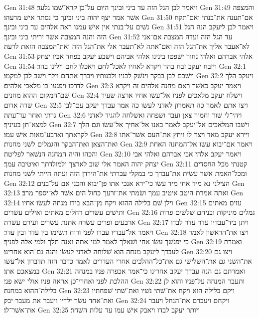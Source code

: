 Gen 31:48  ויאמר לבן הגל הזה עד ביני ובינך היום על־כן קרא־שׁמו גלעד׃
Gen 31:49  והמצפה אשׁר אמר יצף יהוה ביני ובינך כי נסתר אישׁ מרעהו׃
Gen 31:50  אם־תענה את־בנתי ואם־תקח נשׁים על־בנתי אין אישׁ עמנו ראה אלהים עד ביני ובינך׃
Gen 31:51  ויאמר לבן ליעקב הנה הגל הזה והנה המצבה אשׁר יריתי ביני ובינך׃
Gen 31:52  עד הגל הזה ועדה המצבה אם־אני לא־אעבר אליך את־הגל הזה ואם־אתה לא־תעבר אלי את־הגל הזה ואת־המצבה הזאת לרעה׃
Gen 31:53  אלהי אברהם ואלהי נחור ישׁפטו בינינו אלהי אביהם וישׁבע יעקב בפחד אביו יצחק׃
Gen 31:54  ויזבח יעקב זבח בהר ויקרא לאחיו לאכל־לחם ויאכלו לחם וילינו בהר׃
Gen 32:1  וישׁכם לבן בבקר וינשׁק לבניו ולבנותיו ויברך אתהם וילך וישׁב לבן למקמו׃
Gen 32:2  ויעקב הלך לדרכו ויפגעו־בו מלאכי אלהים׃
Gen 32:3  ויאמר יעקב כאשׁר ראם מחנה אלהים זה ויקרא שׁם־המקום ההוא מחנים׃
Gen 32:4  וישׁלח יעקב מלאכים לפניו אל־עשׂו אחיו ארצה שׂעיר שׂדה אדום׃
Gen 32:5  ויצו אתם לאמר כה תאמרון לאדני לעשׂו כה אמר עבדך יעקב עם־לבן גרתי ואחר עד־עתה׃
Gen 32:6  ויהי־לי שׁור וחמור צאן ועבד ושׁפחה ואשׁלחה להגיד לאדני למצא־חן בעיניך׃
Gen 32:7  וישׁבו המלאכים אל־יעקב לאמר באנו אל־אחיך אל־עשׂו וגם הלך לקראתך וארבע־מאות אישׁ עמו׃
Gen 32:8  ויירא יעקב מאד ויצר לו ויחץ את־העם אשׁר־אתו ואת־הצאן ואת־הבקר והגמלים לשׁני מחנות׃
Gen 32:9  ויאמר אם־יבוא עשׂו אל־המחנה האחת והכהו והיה המחנה הנשׁאר לפליטה׃
Gen 32:10  ויאמר יעקב אלהי אבי אברהם ואלהי אבי יצחק יהוה האמר אלי שׁוב לארצך ולמולדתך ואיטיבה עמך׃
Gen 32:11  קטנתי מכל החסדים ומכל־האמת אשׁר עשׂית את־עבדך כי במקלי עברתי את־הירדן הזה ועתה הייתי לשׁני מחנות׃
Gen 32:12  הצילני נא מיד אחי מיד עשׂו כי־ירא אנכי אתו פן־יבוא והכני אם על־בנים׃
Gen 32:13  ואתה אמרת היטב איטיב עמך ושׂמתי את־זרעך כחול הים אשׁר לא־יספר מרב׃
Gen 32:14  וילן שׁם בלילה ההוא ויקח מן־הבא בידו מנחה לעשׂו אחיו׃
Gen 32:15  עזים מאתים ותישׁים עשׂרים רחלים מאתים ואילים עשׂרים׃
Gen 32:16  גמלים מיניקות ובניהם שׁלשׁים פרות ארבעים ופרים עשׂרה אתנת עשׂרים ועירם עשׂרה׃
Gen 32:17  ויתן ביד־עבדיו עדר עדר לבדו ויאמר אל־עבדיו עברו לפני ורוח תשׂימו בין עדר ובין עדר׃
Gen 32:18  ויצו את־הראשׁון לאמר כי יפגשׁך עשׂו אחי ושׁאלך לאמר למי־אתה ואנה תלך ולמי אלה לפניך׃
Gen 32:19  ואמרת לעבדך ליעקב מנחה הוא שׁלוחה לאדני לעשׂו והנה גם־הוא אחרינו׃
Gen 32:20  ויצו גם את־השׁני גם את־השׁלישׁי גם את־כל־ההלכים אחרי העדרים לאמר כדבר הזה תדברון אל־עשׂו במצאכם אתו׃
Gen 32:21  ואמרתם גם הנה עבדך יעקב אחרינו כי־אמר אכפרה פניו במנחה ההלכת לפני ואחרי־כן אראה פניו אולי ישׂא פני׃
Gen 32:22  ותעבר המנחה על־פניו והוא לן בלילה־ההוא במחנה׃
Gen 32:23  ויקם בלילה הוא ויקח את־שׁתי נשׁיו ואת־שׁתי שׁפחתיו ואת־אחד עשׂר ילדיו ויעבר את מעבר יבק׃
Gen 32:24  ויקחם ויעברם את־הנחל ויעבר את־אשׁר־לו׃
Gen 32:25  ויותר יעקב לבדו ויאבק אישׁ עמו עד עלות השׁחר׃
